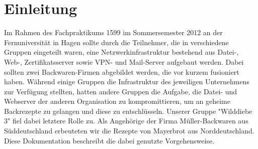 \section{Einleitung}

Im Rahmen des Fachpraktikums 1599 im Sommersemester 2012 an der Fernuniversität in Hagen sollte durch die Teilnehmer, die in verschiedene Gruppen eingeteilt waren, eine Netzwerkinfrastruktur bestehend aus Datei-, Web-, Zertifikatsserver sowie VPN- und Mail-Server aufgebaut werden. Dabei sollten zwei Backwaren-Firmen abgebildet werden, die vor kurzem fusioniert haben. Während einige Gruppen die Infrastruktur des jeweiligen Unternehmens zur Verfügung stellten, hatten andere Gruppen die Aufgabe, die Datei- und Webserver der anderen Organisation zu kompromittieren, um an geheime Backrezepte zu gelangen und diese zu entschlüsseln.
Unserer Gruppe "Wilddiebe 3" fiel dabei letztere Rolle zu. Als Angehörige der Firma Müller-Backwaren aus Süddeutschland erbeuteten wir die Rezepte von Mayerbrot aus Norddeutschland.
Diese Dokumentation beschreibt die dabei genutzte Vorgehensweise.


